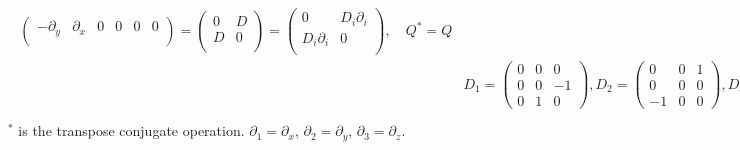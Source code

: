 \documentclass[pdftex,a4paper,parskip,listof=totoc,bibliography=totoc,onehalfspacing,12pt]{scrreprt}
\begin{document}
\begin{equation}
\begin{aligned}
\begin{split}
\begin{pmatrix}
   -\partial_{y}	& \partial_{x} 	& 0         	   & 0	       & 0         & 0        \\
 \end{pmatrix} = 
 \begin{pmatrix}
   0          & D         \\
   D          & 0         \\
 \end{pmatrix} = 
 \begin{pmatrix}
   0          & D_i \partial_{i}         \\
   D_i \partial_{i}          & 0         \\
 \end{pmatrix}, \quad Q^{*}=Q \\
& D_1= 
 \begin{pmatrix}
   0          & 0        & 0 \\
   0          & 0        & -1 \\
   0          & 1        & 0 
 \end{pmatrix},  D_2= 
 \begin{pmatrix}
   0          & 0        & 1 \\
   0          & 0        & 0 \\
  -1          & 0        & 0 
 \end{pmatrix},
  D_3= 
 \begin{pmatrix}
   0          & -1        & 0 \\
   1          & 0        & 0 \\
   0          & 0        & 0 
 \end{pmatrix} ,
 D_i^{*} = D_i^T = -D_i\\
\end{split}
\end{aligned}
\end{equation}
$^{*}$ is the transpose conjugate operation. $\partial_{1} = \partial_{x}$, $\partial_{2} = \partial_{y}$, $\partial_{3} = \partial_{z}$.\\
\end{document}
